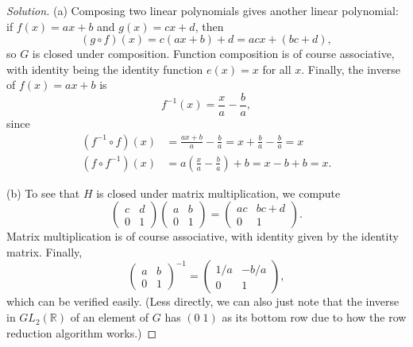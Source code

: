 \documentclass[11pt]{scrartcl}
\providecommand{\RR}{\mathbb R}
\providecommand{\inv}{^{-1}}
\newenvironment{soln}{\begin{proof}[Solution]}{\end{proof}}
\begin{document}
\begin{soln}
    (a) Composing two linear polynomials gives another linear polynomial:
    if $f(x) = ax+b$ and $g(x) = cx+d$, then
    \begin{equation*}
	(g\circ f)(x) = c(ax + b) + d = acx + (bc+d),
    \end{equation*}
    so $G$ is closed under composition.
    Function composition is of course associative,
    with identity being the identity function $e(x) = x$ for all $x$.
    Finally, the inverse of $f(x) = ax + b$ is
    \begin{equation*}
	f\inv(x) = \frac xa - \frac ba,
    \end{equation*}
    since
    \begin{align*}
	(f\inv\circ f)(x) &= \frac{ax+b}a - \frac ba = x + \frac ba - \frac ba = x \\
	(f\circ f\inv)(x) &= a\left(\frac xa - \frac ba\right) + b
	= x - b + b = x.
    \end{align*}

    (b) To see that $H$ is closed under matrix multiplication, we compute
    \begin{equation*}
        \begin{pmatrix}
	    c&d\\ 0&1
        \end{pmatrix}
        \begin{pmatrix}
	    a&b\\ 0&1
        \end{pmatrix} =
        \begin{pmatrix}
	    ac&bc+d\\ 0&1
        \end{pmatrix}.
    \end{equation*}
    Matrix multiplication is of course associative,
    with identity given by the identity matrix.
    Finally,
    \begin{equation*}
        \begin{pmatrix}
	    a&b\\0&1
	\end{pmatrix}\inv =
	\begin{pmatrix}
	    1/a & -b/a\\0&1
	\end{pmatrix},
    \end{equation*}
    which can be verified easily.
    (Less directly, we can also just note that the inverse in
    $GL_2(\RR)$ of an element of $G$ has $(0\; 1)$ as its bottom row
    due to how the row reduction algorithm works.)


\end{soln}
\end{document}
